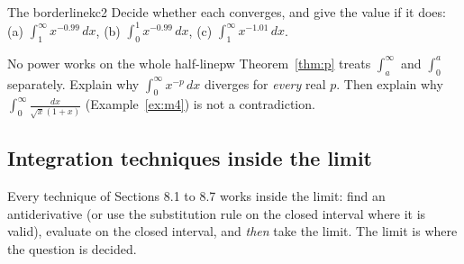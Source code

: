 \documentclass[11pt]{article}
\begin{document}
\begin{kc}{The borderline}{kc2}
Decide whether each converges, and give the value if it does: (a) $\displaystyle\int_1^\infty x^{-0.99}\,dx$, \quad (b) $\displaystyle\int_0^1x^{-0.99}\,dx$, \quad (c) $\displaystyle\int_1^\infty x^{-1.01}\,dx$.
\end{kc}

\begin{think}{No power works on the whole half-line}{pw}
Theorem~\ref{thm:p} treats $\int_a^\infty$ and $\int_0^a$ separately. Explain why $\int_0^\infty x^{-p}\,dx$ diverges for \emph{every} real $p$. Then explain why $\int_0^\infty\frac{dx}{\sqrt x(1+x)}$ (Example~\ref{ex:m4}) is not a contradiction.
\end{think}

\subsection*{Integration techniques inside the limit}

Every technique of Sections 8.1 to 8.7 works inside the limit: find an antiderivative (or use the substitution rule on the closed interval where it is valid), evaluate on the closed interval, and \emph{then} take the limit. The limit is where the question is decided.
\end{document}
